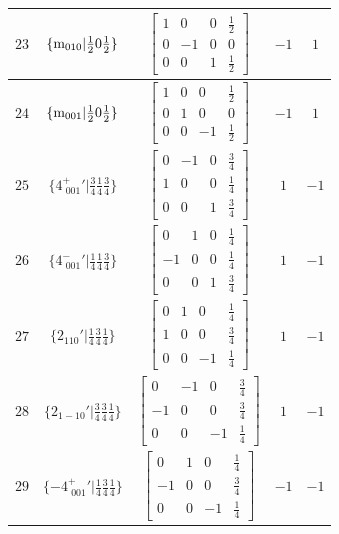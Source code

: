 \documentclass[fleqn,8pt]{jsarticle}
\begin{document}
\begin{longtable}{ccccc}
$ 23 $ & $ \{{\rm m}_{010}|\frac{1}{2} 0 \frac{1}{2}\} $ & $ \begin{bmatrix} 1 & 0 & 0 & \frac{1}{2} \\ 0 & -1 & 0 & 0 \\ 0 & 0 & 1 & \frac{1}{2} \end{bmatrix} $ & $ -1 $ & $ 1 $ \\ \hline
$ 24 $ & $ \{{\rm m}_{001}|\frac{1}{2} 0 \frac{1}{2}\} $ & $ \begin{bmatrix} 1 & 0 & 0 & \frac{1}{2} \\ 0 & 1 & 0 & 0 \\ 0 & 0 & -1 & \frac{1}{2} \end{bmatrix} $ & $ -1 $ & $ 1 $ \\ \hline
$ 25 $ & $ \{4^{+}_{\,\,001}{}'|\frac{3}{4} \frac{1}{4} \frac{3}{4}\} $ & $ \begin{bmatrix} 0 & -1 & 0 & \frac{3}{4} \\ 1 & 0 & 0 & \frac{1}{4} \\ 0 & 0 & 1 & \frac{3}{4} \end{bmatrix} $ & $ 1 $ & $ -1 $ \\ \hline
$ 26 $ & $ \{4^{-}_{\,\,001}{}'|\frac{1}{4} \frac{1}{4} \frac{3}{4}\} $ & $ \begin{bmatrix} 0 & 1 & 0 & \frac{1}{4} \\ -1 & 0 & 0 & \frac{1}{4} \\ 0 & 0 & 1 & \frac{3}{4} \end{bmatrix} $ & $ 1 $ & $ -1 $ \\ \hline
$ 27 $ & $ \{2{}_{110}{}'|\frac{1}{4} \frac{3}{4} \frac{1}{4}\} $ & $ \begin{bmatrix} 0 & 1 & 0 & \frac{1}{4} \\ 1 & 0 & 0 & \frac{3}{4} \\ 0 & 0 & -1 & \frac{1}{4} \end{bmatrix} $ & $ 1 $ & $ -1 $ \\ \hline
$ 28 $ & $ \{2{}_{1-10}{}'|\frac{3}{4} \frac{3}{4} \frac{1}{4}\} $ & $ \begin{bmatrix} 0 & -1 & 0 & \frac{3}{4} \\ -1 & 0 & 0 & \frac{3}{4} \\ 0 & 0 & -1 & \frac{1}{4} \end{bmatrix} $ & $ 1 $ & $ -1 $ \\ \hline
$ 29 $ & $ \{-4^{+}_{\,\,001}{}'|\frac{1}{4} \frac{3}{4} \frac{1}{4}\} $ & $ \begin{bmatrix} 0 & 1 & 0 & \frac{1}{4} \\ -1 & 0 & 0 & \frac{3}{4} \\ 0 & 0 & -1 & \frac{1}{4} \end{bmatrix} $ & $ -1 $ & $ -1 $ \\ \hline

\end{longtable}
\end{document}
